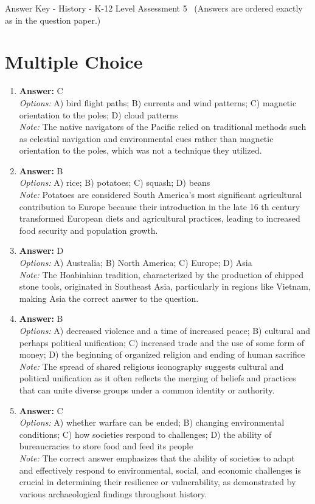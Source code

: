 \documentclass[12pt]{article}
\begin{document}
\begin{center}
Answer Key - History - K-12 Level Assessment 5 \
\small (Answers are ordered exactly as in the question paper.)
\end{center}

\section*{Multiple Choice}
\begin{enumerate}[label=\arabic*.]
\item \textbf{Answer:} C
\\ \textit{Options:} A) bird flight paths; B) currents and wind patterns; C) magnetic orientation to the poles; D) cloud patterns
\\ \textit{Note:} The native navigators of the Pacific relied on traditional methods such as celestial navigation and environmental cues rather than magnetic orientation to the poles, which was not a technique they utilized.
\item \textbf{Answer:} B
\\ \textit{Options:} A) rice; B) potatoes; C) squash; D) beans
\\ \textit{Note:} Potatoes are considered South America's most significant agricultural contribution to Europe because their introduction in the late 16 th century transformed European diets and agricultural practices, leading to increased food security and population growth.
\item \textbf{Answer:} D
\\ \textit{Options:} A) Australia; B) North America; C) Europe; D) Asia
\\ \textit{Note:} The Hoabinhian tradition, characterized by the production of chipped stone tools, originated in Southeast Asia, particularly in regions like Vietnam, making Asia the correct answer to the question.
\item \textbf{Answer:} B
\\ \textit{Options:} A) decreased violence and a time of increased peace; B) cultural and perhaps political unification; C) increased trade and the use of some form of money; D) the beginning of organized religion and ending of human sacrifice
\\ \textit{Note:} The spread of shared religious iconography suggests cultural and political unification as it often reflects the merging of beliefs and practices that can unite diverse groups under a common identity or authority.
\item \textbf{Answer:} C
\\ \textit{Options:} A) whether warfare can be ended; B) changing environmental conditions; C) how societies respond to challenges; D) the ability of bureaucracies to store food and feed its people
\\ \textit{Note:} The correct answer emphasizes that the ability of societies to adapt and effectively respond to environmental, social, and economic challenges is crucial in determining their resilience or vulnerability, as demonstrated by various archaeological findings throughout history.
\end{enumerate}
\end{document}
